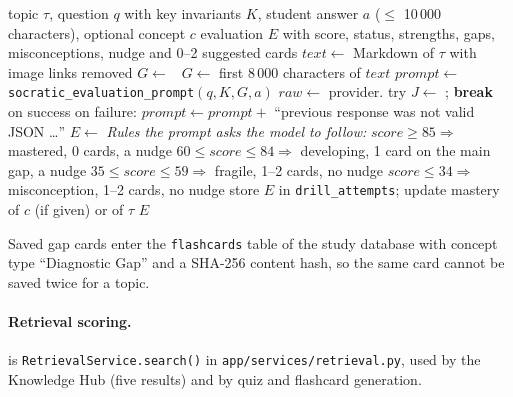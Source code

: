 \begin{algorithm}[htbp]
\caption{Socratic evaluation: score bands and gap flashcards}\label{alg:socratic}
\begin{algorithmic}[1]
\Require topic $\tau$, question $q$ with key invariants $K$, student answer $a$ ($\leq$ 10\,000 characters), optional concept $c$
\Ensure evaluation $E$ with score, status, strengths, gaps, misconceptions, nudge and 0--2 suggested cards
\State $text \gets$ Markdown of $\tau$ with image links removed
 $G \gets$ 
\Else\ $G \gets$ first 8\,000 characters of $text$ \EndIf
\State $prompt \gets$ \texttt{socratic\_evaluation\_prompt}$(q, K, G, a)$ 
  \State $raw \gets$ provider.
  \State try $J \gets$ ; \textbf{break} on success
  \State on failure: $prompt \gets prompt +$ ``previous response was not valid JSON \ldots''
\EndFor
\State $E \gets$  
\Statex \hspace{\algorithmicindent}\textit{Rules the prompt asks the model to follow:}
\Statex \hspace{\algorithmicindent}$score \ge 85 \Rightarrow$ mastered, 0 cards, a nudge
\Statex \hspace{\algorithmicindent}$60 \le score \le 84 \Rightarrow$ developing, 1 card on the main gap, a nudge
\Statex \hspace{\algorithmicindent}$35 \le score \le 59 \Rightarrow$ fragile, 1--2 cards, no nudge
\Statex \hspace{\algorithmicindent}$score \le 34 \Rightarrow$ misconception, 1--2 cards, no nudge
\State store $E$ in \texttt{drill\_attempts}; update mastery of $c$ (if given) or of $\tau$
\State \Return $E$ 
\end{algorithmic}
\end{algorithm}

Saved gap cards enter the \texttt{flashcards} table of the study database with concept
type ``Diagnostic Gap'' and a SHA-256 content hash, so the same card cannot be saved twice
for a topic.

\paragraph{Retrieval scoring.}
 is \texttt{RetrievalService.\allowbreak{}search()} in
\texttt{app/services/\allowbreak{}retrieval.py}, used by the Knowledge Hub (five results) and by quiz
and flashcard generation.

